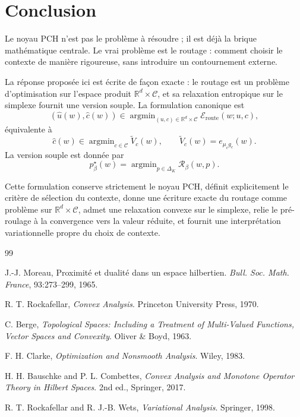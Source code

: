 \documentclass[11pt,a4paper]{article}
\DeclareMathOperator{\argmin}{argmin}
\newcommand{\R}{\mathbb R}
\newcommand{\Ccal}{\mathcal C}
\newcommand{\Rcal}{\mathcal R}
\begin{document}
\section{Conclusion}

Le noyau PCH n'est pas le problème à résoudre ; il est déjà la brique mathématique centrale. Le vrai problème est le routage : comment choisir le contexte de manière rigoureuse, sans introduire un contournement externe.

La réponse proposée ici est écrite de façon exacte : le routage est un problème d'optimisation sur l'espace produit \(\R^d\times\Ccal\), et sa relaxation entropique sur le simplexe fournit une version souple. La formulation canonique est
\[
(\hat u(w),\hat c(w))\in\argmin_{(u,c)\in\R^d\times\Ccal}\mathcal E_{\mathrm{route}}(w;u,c),
\]
équivalente à
\[
\hat c(w)\in\argmin_{c\in\Ccal}\widetilde V_c(w),
\qquad
\widetilde V_c(w)=e_{\mu_c g_c}(w).
\]
La version souple est donnée par
\[
p^\star_\beta(w)
=
\argmin_{p\in\Delta_K}\Rcal_\beta(w,p).
\]

Cette formulation conserve strictement le noyau PCH, définit explicitement le critère de sélection du contexte, donne une écriture exacte du routage comme problème sur \(\R^d\times\Ccal\), admet une relaxation convexe sur le simplexe, relie le pré-roulage à la convergence vers la valeur réduite, et fournit une interprétation variationnelle propre du choix de contexte.

\begin{thebibliography}{99}

J.-J. Moreau,
\newblock Proximité et dualité dans un espace hilbertien.
\newblock \emph{Bull. Soc. Math. France}, 93:273--299, 1965.

R. T. Rockafellar,
\newblock \emph{Convex Analysis}.
\newblock Princeton University Press, 1970.

C. Berge,
\newblock \emph{Topological Spaces: Including a Treatment of Multi-Valued Functions, Vector Spaces and Convexity}.
\newblock Oliver \& Boyd, 1963.

F. H. Clarke,
\newblock \emph{Optimization and Nonsmooth Analysis}.
\newblock Wiley, 1983.

H. H. Bauschke and P. L. Combettes,
\newblock \emph{Convex Analysis and Monotone Operator Theory in Hilbert Spaces}.
\newblock 2nd ed., Springer, 2017.

R. T. Rockafellar and R. J.-B. Wets,
\newblock \emph{Variational Analysis}.
\newblock Springer, 1998.

\end{thebibliography}
\end{document}
